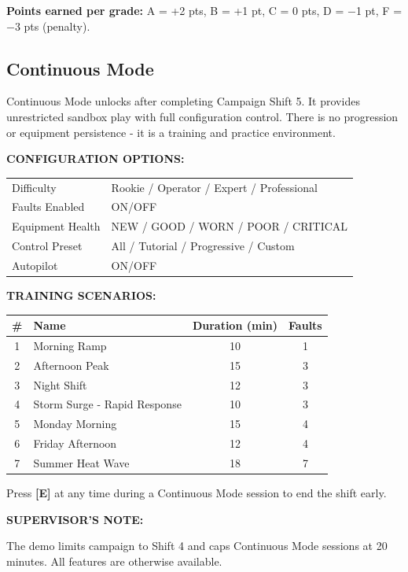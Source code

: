 \documentclass[10pt,a5paper]{article}
\newenvironment{notebox}{%
  \vspace{4pt}%
  \textbf{SUPERVISOR'S NOTE:} \bfseries%
}{%
}
\newcommand{\key}[1]{\textbf{[#1]}}
\begin{document}
\textbf{Points earned per grade:} A = +2 pts, B = +1 pt, C = 0 pts, D = $-$1 pt,
F = $-$3 pts (penalty).

\subsection{Continuous Mode}

Continuous Mode unlocks after completing Campaign Shift 5. It provides
unrestricted sandbox play with full configuration control. There is no
progression or equipment persistence - it is a training and practice
environment.

\textbf{\uppercase{Configuration options:}}

\begin{tabular}{ll}  
Difficulty        & Rookie / Operator / Expert / Professional \\
Faults Enabled    & ON/OFF \\
Equipment Health  & NEW / GOOD / WORN / POOR / CRITICAL\\
Control Preset    & All / Tutorial / Progressive / Custom \\
Autopilot         & ON/OFF \\
\end{tabular}

\newpage
\textbf{\uppercase{Training Scenarios:}}

\begin{center}
\begin{tabular}{clcc}
\toprule
\textbf{\#} & \textbf{Name} & \textbf{Duration (min)} & \textbf{Faults} \\
\midrule
1 & Morning Ramp              & 10  & 1 \\
2 & Afternoon Peak            & 15  & 3 \\
3 & Night Shift               & 12  & 3 \\
4 & Storm Surge - Rapid Response & 10  & 3 \\
5 & Monday Morning            & 15  & 4 \\
6 & Friday Afternoon          & 12  & 4 \\
7 & Summer Heat Wave          & 18  & 7 \\
\bottomrule
\end{tabular}
\end{center}

Press \key{E} at any time during a Continuous Mode session to end the shift
early.

\begin{notebox}
The demo limits campaign to Shift 4 and caps Continuous Mode
sessions at 20 minutes. All features are otherwise available.
\end{notebox}
\end{document}
